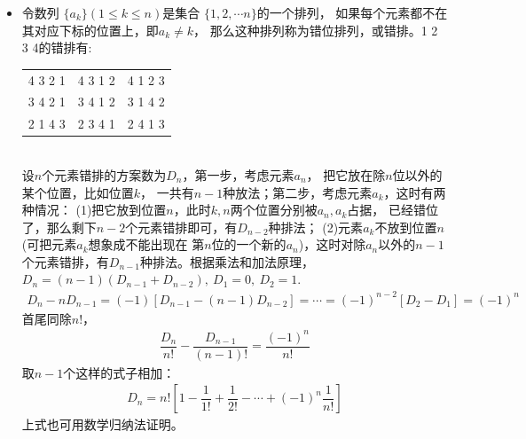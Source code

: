 \begin{itemize}[leftmargin=\inteval{\myitemleftmargin}pt,itemsep=
   \inteval{\myitemitempsep}pt,topsep=\inteval{\myitemtopsep}pt]
\item 令数列 $ \{ a_k \} (1\leq k \leq n) $是集合
$ \{ 1,2,\cdots n \} $的一个排列，
如果每个元素都不在其对应下标的位置上，即$ a_k\neq k $，
那么这种排列称为错位排列，或错排。1 2 3 4的错排有:
\begin{table}[h]
    \centering
    \begin{tabular}{ccc}
        4 3 2 1 & 4 3 1 2 & 4 1 2 3 \\
        3 4 2 1 & 3 4 1 2 & 3 1 4 2 \\
        2 1 4 3 & 2 3 4 1 & 2 4 1 3 
    \end{tabular}
\end{table} \\
设$ n $个元素错排的方案数为$ D_n $，第一步，考虑元素$ a_n $，
把它放在除$ n $位以外的某个位置，比如位置$ k $，
一共有$ n-1 $种放法；第二步，考虑元素$ a_k $，这时有两种情况：
(1)把它放到位置$ n $，此时$ k,n $两个位置分别被$ a_n,a_k $占据，
已经错位了，那么剩下$ n-2 $个元素错排即可，有$ D_{n-2} $种排法；
(2)元素$ a_k $不放到位置$ n $(可把元素$ a_k $想象成不能出现在
第$ n $位的一个新的$ a_n $)，这时对除$ a_n $以外的$ n-1 $
个元素错排，有$ D_{n-1} $种排法。根据乘法和加法原理，
$ D_n=(n-1)(D_{n-1}+D_{n-2}),\ D_1=0,\ D_2=1. $
\begin{gather*}
    D_n-nD_{n-1}=(-1)[D_{n-1}-(n-1)D_{n-2}]=\cdots =(-1)^{n-2}[D_2-D_1]=(-1)^n 
\end{gather*}
首尾同除$ n! $，
\begin{gather*}
    \dfrac{D_n}{n!}-\dfrac{D_{n-1}}{(n-1)!}=\dfrac{(-1)^n}{n!} 
\end{gather*}
取$ n-1 $个这样的式子相加：
\begin{align}\label{错排通项公式}
    D_n=n!\left[ 1-\dfrac{1}{1!}+\dfrac{1}{2!}-\cdots 
    +(-1)^n\dfrac{1}{n!}\right] 
\end{align}
上式也可用数学归纳法证明。


\end{itemize}
